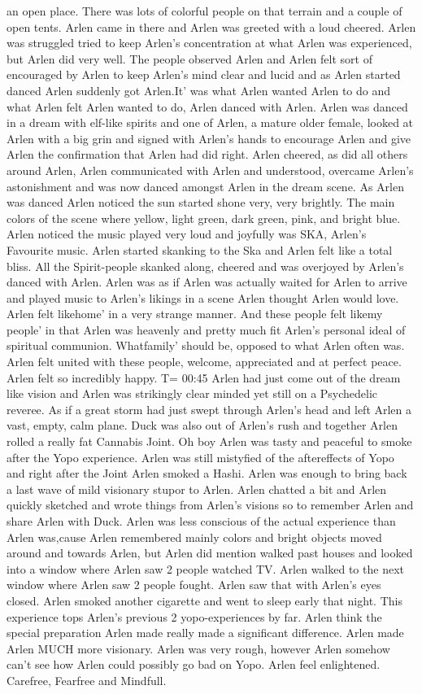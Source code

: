 \documentclass[12pt]{book}
\begin{document}
an open place. There was lots of colorful people on that terrain and a couple of open tents. Arlen came in there and Arlen was greeted with a loud cheered. Arlen was struggled tried to keep Arlen's concentration at what Arlen was experienced, but Arlen did very well. The people observed Arlen and Arlen felt sort of encouraged by Arlen to keep Arlen's mind clear and lucid and as Arlen started danced Arlen suddenly got Arlen.It' was what Arlen wanted Arlen to do and what Arlen felt Arlen wanted to do, Arlen danced with Arlen. Arlen was danced in a dream with elf-like spirits and one of Arlen, a mature older female, looked at Arlen with a big grin and signed with Arlen's hands to encourage Arlen and give Arlen the confirmation that Arlen had did right. Arlen cheered, as did all others around Arlen, Arlen communicated with Arlen and understood, overcame Arlen's astonishment and was now danced amongst Arlen in the dream scene. As Arlen was danced Arlen noticed the sun started shone very, very brightly. The main colors of the scene where yellow, light green, dark green, pink, and bright blue. Arlen noticed the music played very loud and joyfully was SKA, Arlen's Favourite music. Arlen started skanking to the Ska and Arlen felt like a total bliss. All the Spirit-people skanked along, cheered and was overjoyed by Arlen's danced with Arlen. Arlen was as if Arlen was actually waited for Arlen to arrive and played music to Arlen's likings in a scene Arlen thought Arlen would love. Arlen felt likehome' in a very strange manner. And these people felt likemy people' in that Arlen was heavenly and pretty much fit Arlen's personal ideal of spiritual communion. Whatfamily' should be, opposed to what Arlen often was. Arlen felt united with these people, welcome, appreciated and at perfect peace. Arlen felt so incredibly happy. T= 00:45 Arlen had just come out of the dream like vision and Arlen was strikingly clear minded yet still on a Psychedelic reveree. As if a great storm had just swept through Arlen's head and left Arlen a vast, empty, calm plane. Duck was also out of Arlen's rush and together Arlen rolled a really fat Cannabis Joint. Oh boy Arlen was tasty and peaceful to smoke after the Yopo experience. Arlen was still mistyfied of the aftereffects of Yopo and right after the Joint Arlen smoked a Hashi. Arlen was enough to bring back a last wave of mild visionary stupor to Arlen. Arlen chatted a bit and Arlen quickly sketched and wrote things from Arlen's visions so to remember Arlen and share Arlen with Duck. Arlen was less conscious of the actual experience than Arlen was,cause Arlen remembered mainly colors and bright objects moved around and towards Arlen, but Arlen did mention walked past houses and looked into a window where Arlen saw 2 people watched TV. Arlen walked to the next window where Arlen saw 2 people fought. Arlen saw that with Arlen's eyes closed. Arlen smoked another cigarette and went to sleep early that night. This experience tops Arlen's previous 2 yopo-experiences by far. Arlen think the special preparation Arlen made really made a significant difference. Arlen made Arlen MUCH more visionary. Arlen was very rough, however Arlen somehow can't see how Arlen could possibly go bad on Yopo. Arlen feel enlightened. Carefree, Fearfree and Mindfull.
\end{document}
